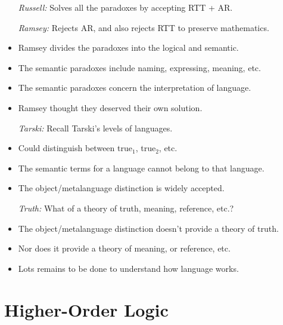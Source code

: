 \documentclass[a4paper, 11pt]{article} %
\begin{document}
  \begin{itemize}
    \item[\it Russell:] Solves all the paradoxes by accepting RTT + AR.
    \item[\it Ramsey:] Rejects AR, and also rejects RTT to preserve mathematics.
      \item Ramsey divides the paradoxes into the logical and semantic.
      \item The semantic paradoxes include naming, expressing, meaning, etc.
      \item The semantic paradoxes concern the interpretation of language.
      \item Ramsey thought they deserved their own solution.
    \item[\it Tarski:] Recall Tarski's levels of languages.
      \item Could distinguish between true$_1$, true$_2$, etc.
      \item The semantic terms for a language cannot belong to that language.
      \item The object/metalanguage distinction is widely accepted.
    \item[\it Truth:] What of a theory of truth, meaning, reference, etc.?
      \item The object/metalanguage distinction doesn't provide a theory of truth.
      \item Nor does it provide a theory of meaning, or reference, etc.
      \item Lots remains to be done to understand how language works.
  \end{itemize}






\section*{Higher-Order Logic}
\end{document}
